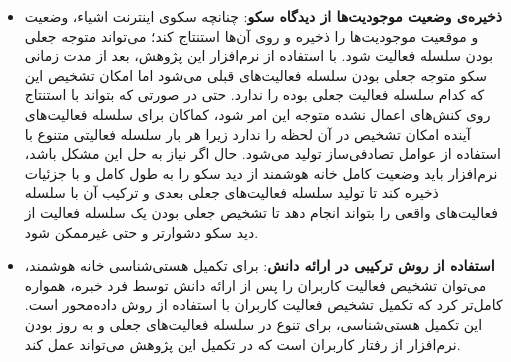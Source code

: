 \begin{itemize}
\item \textbf{ذخیره‌ی وضعیت موجودیت‌ها از دیدگاه سکو}: چنانچه سکوی اینترنت اشیاء، وضعیت و موقعیت موجودیت‌ها را ذخیره و روی آن‌ها استنتاج کند؛ می‌تواند متوجه جعلی بودن سلسله فعالیت شود. با استفاده از نرم‌افزار این پژوهش، بعد از مدت زمانی سکو متوجه جعلی بودن سلسله فعالیت‌های قبلی می‌شود اما امکان تشخیص این که کدام سلسله فعالیت جعلی بوده را ندارد. حتی در صورتی که بتواند با استنتاج روی کنش‌های اعمال نشده متوجه این امر شود، کماکان برای سلسله فعالیت‌های آینده امکان تشخیص در آن لحظه را ندارد زیرا هر بار سلسله فعالیتی متنوع با استفاده از عوامل تصادفی‌ساز تولید می‌شود. حال اگر نیاز به حل این مشکل باشد، نرم‌افزار باید وضعیت کامل خانه هوشمند از دید سکو را به طول کامل و با جزئیات ذخیره کند تا تولید سلسله فعالیت‌های جعلی بعدی و ترکیب آن با سلسله فعالیت‌های واقعی را بتواند انجام دهد تا تشخیص جعلی بودن یک سلسله فعالیت از دید سکو دشوارتر و حتی غیرممکن شود.
\item \textbf{استفاده از روش ترکیبی در ارائه دانش}: برای تکمیل هستی‌شناسی خانه هوشمند، می‌توان تشخیص فعالیت کاربران را پس از ارائه دانش توسط فرد خبره، همواره کامل‌تر کرد که تکمیل تشخیص فعالیت کاربران با استفاده از روش داده‌محور است. این تکمیل هستی‌شناسی، برای تنوع در سلسله فعالیت‌های جعلی و به روز بودن نرم‌افزار از رفتار کاربران است که در تکمیل این پژوهش می‌تواند عمل کند.
‌\end{itemize}
